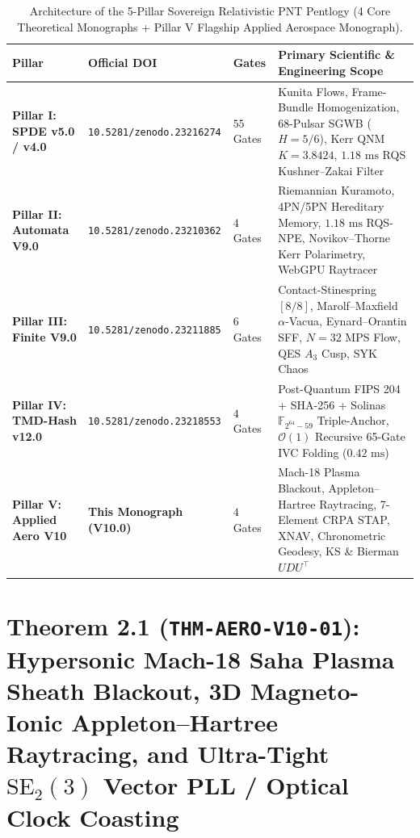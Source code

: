 \documentclass[11pt,a4paper]{article}
\theoremstyle{plain}
\theoremstyle{definition}
\theoremstyle{remark}
\begin{document}
\begin{table}[H]
\centering
\caption{Architecture of the 5-Pillar Sovereign Relativistic PNT Pentlogy (4 Core Theoretical Monographs + Pillar V Flagship Applied Aerospace Monograph).}
\label{tab:pentlogy_overview}
\footnotesize
\setlength{\tabcolsep}{4pt}
\begin{tabularx}{\textwidth}{l l l X}
\toprule
\textbf{Pillar} & \textbf{Official DOI} & \textbf{Gates} & \textbf{Primary Scientific \& Engineering Scope} \\
\midrule
\textbf{Pillar I: SPDE v5.0 / v4.0} & \texttt{10.5281/zenodo.23216274} & $55$ Gates & Kunita Flows, Frame-Bundle Homogenization, 68-Pulsar SGWB ($H=5/6$), Kerr QNM $K=3.8424$, $1.18\text{ ms}$ RQS Kushner--Zakai Filter \\
\textbf{Pillar II: Automata V9.0} & \texttt{10.5281/zenodo.23210362} & $4$ Gates & Riemannian Kuramoto, 4PN/5PN Hereditary Memory, $1.18\text{ ms}$ RQS-NPE, Novikov--Thorne Kerr Polarimetry, WebGPU Raytracer \\
\textbf{Pillar III: Finite V9.0} & \texttt{10.5281/zenodo.23211885} & $6$ Gates & Contact-Stinespring $[8/8]$, Marolf--Maxfield $\alpha$-Vacua, Eynard--Orantin SFF, $N=32$ MPS Flow, QES $A_3$ Cusp, SYK Chaos \\
\textbf{Pillar IV: TMD-Hash v12.0} & \texttt{10.5281/zenodo.23218553} & $4$ Gates & Post-Quantum FIPS 204 + SHA-256 + Solinas $\mathbb{F}_{2^{64}-59}$ Triple-Anchor, $\mathcal{O}(1)$ Recursive 65-Gate IVC Folding ($0.42\text{ ms}$) \\
\textbf{Pillar V: Applied Aero V10} & \textbf{This Monograph (V10.0)} & $4$ Gates & Mach-18 Plasma Blackout, Appleton--Hartree Raytracing, 7-Element CRPA STAP, XNAV, Chronometric Geodesy, KS \& Bierman $UDU^\top$ \\
\bottomrule
\end{tabularx}
\end{table}

\section{\texorpdfstring{Theorem 2.1 (\texttt{THM-AERO-V10-01}): Hypersonic Mach-18 Saha Plasma Sheath Blackout, 3D Magneto-Ionic Appleton--Hartree Raytracing, and Ultra-Tight $\text{SE}_2(3)$ Vector PLL / Optical Clock Coasting}{Theorem 2.1 (THM-AERO-V10-01): Hypersonic Mach-18 Saha Plasma Sheath Blackout, 3D Magneto-Ionic Appleton-Hartree Raytracing, and Ultra-Tight SE2(3) Vector PLL / Optical Clock Coasting}}
\end{document}
